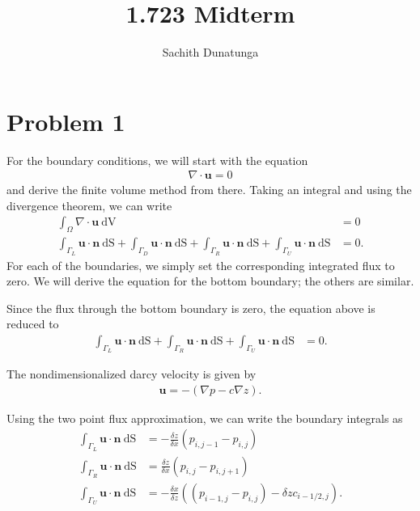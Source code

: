 \documentclass{article}
\title{1.723 Midterm}
\author{Sachith  Dunatunga}
\begin{document}
\maketitle

\section{Problem 1}
For the boundary conditions, we will start with the equation
\begin{align}
 \nabla \cdot \mathbf{u} = 0
\end{align}
and derive the finite volume method from there.
Taking an integral and using the divergence theorem, we can write
\begin{align}
\int_\Omega \nabla \cdot \mathbf{u}\ \mathrm{dV} &= 0 \\
\int_{\Gamma_{L}} \mathbf{u} \cdot \mathbf{n}\ \mathrm{dS} +
\int_{\Gamma_{D}} \mathbf{u} \cdot \mathbf{n}\ \mathrm{dS} +
\int_{\Gamma_{R}} \mathbf{u} \cdot \mathbf{n}\ \mathrm{dS} +
\int_{\Gamma_{U}} \mathbf{u} \cdot \mathbf{n}\ \mathrm{dS} &= 0.
\end{align}
For each of the boundaries, we simply set the corresponding integrated flux to zero.
We will derive the equation for the bottom boundary; the others are similar.

Since the flux through the bottom boundary is zero, the equation above is reduced to
\begin{align}
\int_{\Gamma_{L}} \mathbf{u} \cdot \mathbf{n}\ \mathrm{dS} +
\int_{\Gamma_{R}} \mathbf{u} \cdot \mathbf{n}\ \mathrm{dS} +
\int_{\Gamma_{U}} \mathbf{u} \cdot \mathbf{n}\ \mathrm{dS} &= 0.
\end{align}

The nondimensionalized darcy velocity is given by
\begin{align}
\mathbf{u} = - (\nabla p - c \nabla z).
\end{align}

Using the two point flux approximation, we can write the boundary integrals as
\begin{align}
\int_{\Gamma_{L}} \mathbf{u} \cdot \mathbf{n}\ \mathrm{dS} &= - \frac{\delta z}{\delta x} (p_{i,j-1} - p_{i,j}) \\
\int_{\Gamma_{R}} \mathbf{u} \cdot \mathbf{n}\ \mathrm{dS} &= \frac{\delta z}{\delta x} (p_{i,j} - p_{i,j+1}) \\
\int_{\Gamma_{U}} \mathbf{u} \cdot \mathbf{n}\ \mathrm{dS} &= - \frac{\delta x}{\delta z} \left( (p_{i-1,j} - p_{i,j}) - \delta z c_{i-1/2,j} \right).
\end{align}
\end{document}
